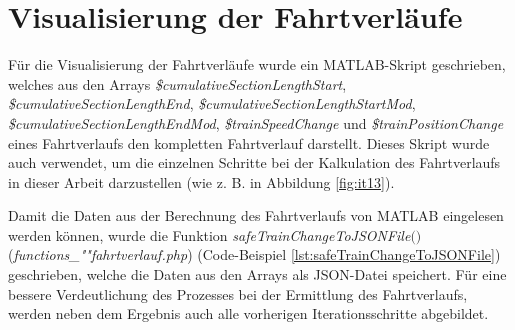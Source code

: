 \section{Visualisierung der Fahrtverläufe} \label{visualisierungFahrtverlaeufe}
Für die Visualisierung der Fahrtverläufe wurde ein MATLAB-Skript geschrieben, welches aus den Arrays \textit{\$cumulativeSectionLengthStart}, \textit{\$cumulativeSectionLengthEnd}, \textit{\$cumulativeSectionLengthStartMod}, \textit{\$cumulativeSectionLengthEndMod}, \textit{\$trainSpeedChange} und \textit{\$trainPositionChange} eines Fahrtverlaufs den kompletten Fahrtverlauf darstellt. Dieses Skript wurde auch verwendet, um die einzelnen Schritte bei der Kalkulation des Fahrtverlaufs in dieser Arbeit darzustellen (wie z. B. in Abbildung \ref{fig:it13}). 

Damit die Daten aus der Berechnung des Fahrtverlaufs von MATLAB eingelesen werden können, wurde die Funktion \textit{safe\-Train\-Change\-To\-JSON\-File$($$)$} (\textit{func\-tions\_""fahrtverlauf.php}) (Code-Beispiel \ref{lst:safeTrainChangeToJSONFile}) geschrieben, welche die Daten aus den Arrays als JSON-Datei speichert. Für eine bessere Verdeutlichung des Prozesses bei der Ermittlung des Fahrtverlaufs, werden neben dem Ergebnis auch alle vorherigen Iterationsschritte abgebildet.

